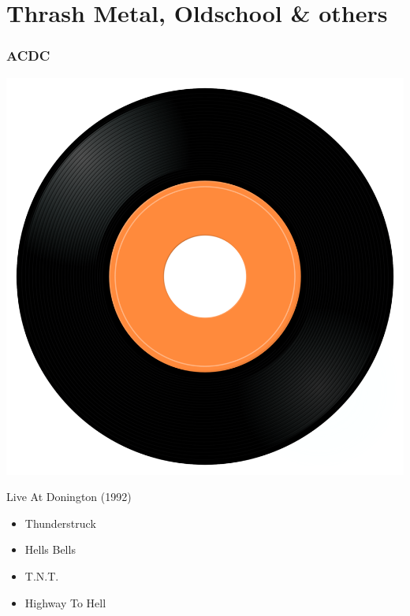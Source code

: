 
\section{Thrash Metal, Oldschool \& others}

\subsubsection{ACDC}

\begin{minipage}[t]{0.25\textwidth}
\captionsetup{type=figure}
\includegraphics[width=\textwidth]{Images/cover.png}
\caption*{Live At Donington (1992)}
\end{minipage}
\begin{minipage}[t]{0.25\textwidth}\vspace{0pt}
\begin{itemize}[nosep,leftmargin=1em,labelwidth=*,align=left]
	\setlength{\itemsep}{0pt}
	\item Thunderstruck
	\item Hells Bells
	\item T.N.T.
	\item Highway To Hell
\end{itemize}
\end{minipage}

